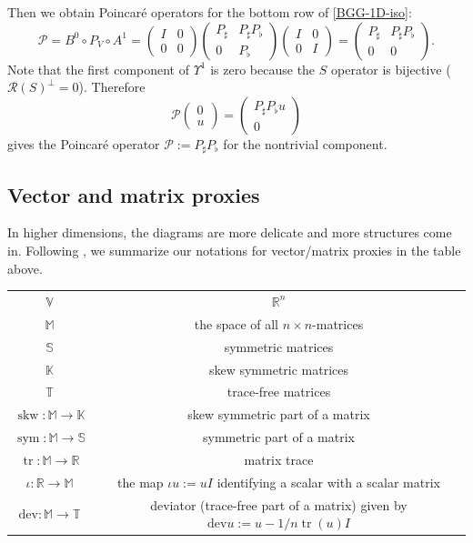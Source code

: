 \documentclass[11pt]{amsart}
\newcommand{\0}{\mathaccent23}
\newcommand\tr{\operatorname{tr}}
\newcommand\skw{\operatorname{skw}}
\newcommand\sym{\operatorname{sym}}
\newcommand\dev{\mathrm{dev}}
\newcommand\ran{\mathcal{R}}
\newcommand\K{\mathbb{K}}
\newcommand\M{\mathbb{M}}
\renewcommand\S{{\mathbb S}}
\newcommand\R{\mathbb{R}}
\begin{document}
Then we obtain Poincar\'e operators for the bottom row of \eqref{BGG-1D-iso}:
$$
 {\mathscr{P}}=B^{0}\circ P_{V} \circ A^{1}=\left (
\begin{array}{cc}
I & 0\\
0 & 0
\end{array}
\right )\left (
\begin{array}{cc}
P_{\sharp} & P_{\sharp}P_{\flat}\\
0 & P_{\flat}
\end{array}
\right )\left (
\begin{array}{cc}
I & 0\\
0 & I
\end{array}
\right )=\left (
\begin{array}{cc}
P_{\sharp} & P_{\sharp}P_{\flat}\\
0 & 0
\end{array}
\right ).
$$
Note that the first component of $\Upsilon^{1}$ is zero because the $S$ operator is bijective ($\ran(S)^{\perp}=0$). Therefore
$$
\mathscr {P}\left (
\begin{array}{c}
0 \\
u 
\end{array}
\right )=\left (
{ \begin{array}{c}
    P_{\sharp}P_{\flat}u\\
    0
\end{array}}
\right )
$$
gives the Poincar\'e operator $\mathscr{P}:=P_{\sharp}P_{\flat}$ for the nontrivial component.

\subsection{Vector and matrix proxies}
In higher dimensions, the diagrams are more delicate and more structures come in. Following \cite{arnold2021complexes,vcap2022bgg}, we summarize our notations for vector/matrix proxies in the table above.
\begin{table}[h!]
\begin{center}
\begin{tabular}{c|c}
$\mathbb V$ & $\mathbb R^n$  \\
$\mathbb M$ &the space of all $n\times n$-matrices\\
$\mathbb S$ & symmetric matrices\\
$\mathbb K$ & skew symmetric matrices\\
$\mathbb T$ & trace-free matrices\\
$\skw: \M\to \K$ & skew symmetric part of a matrix\\
$\sym: \M\to \S$ & symmetric part of a matrix\\
$\tr:\M\to\R$ & matrix trace\\
$\iota: \R\to \M$  & the map $\iota u:= uI$ identifying a scalar with a scalar matrix\\
$\dev:\mathbb{M}\to \mathbb{T}$ & deviator (trace-free part of a matrix) given by $\dev u:=u-1/n \tr (u)I$\\
\end{tabular}
\end{center}
\end{table}
\end{document}
